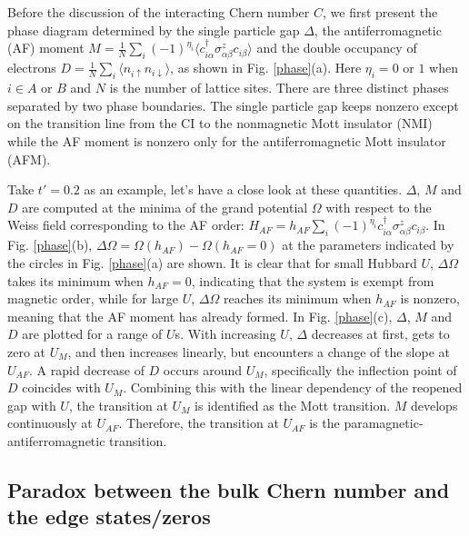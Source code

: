 \documentclass[12pt]{iopart}
\begin{document}
\par Before the discussion of the interacting Chern number $C$, we first present the phase diagram determined by the single particle gap $\Delta$, the antiferromagnetic (AF) moment $M=\frac{1}{N}\sum_i(-1)^{\eta_i}\langle c^\dagger_{i\alpha}\sigma^z_{\alpha\beta}c_{i\beta}\rangle$ and the double occupancy of electrons $D=\frac{1}{N}\sum_i\langle n_{i\uparrow}n_{i\downarrow}\rangle$, as shown in Fig. \ref{phase}(a). Here $\eta_i=0$ or $1$ when $i\in A$ or $B$ and $N$ is the number of lattice sites. There are three distinct phases separated by two phase boundaries. The single particle gap keeps nonzero except on the transition line from the CI to the nonmagnetic Mott insulator (NMI) while the AF moment is nonzero only for the antiferromagnetic Mott insulator (AFM).

\par Take $t'=0.2$ as an example, let's have a close look at these quantities. $\Delta$, $M$ and $D$ are computed at the minima of the grand potential $\Omega$ with respect to the Weiss field corresponding to the AF order: $H_{AF}=h_{AF}\sum_i(-1)^{\eta_i}c^\dagger_{i\alpha}\sigma^z_{\alpha\beta}c_{i\beta}$. In Fig. \ref{phase}(b), $\Delta\Omega=\Omega(h_{AF})-\Omega(h_{AF}=0)$ at the parameters indicated by the circles in Fig. \ref{phase}(a) are shown. It is clear that for small Hubbard $U$, $\Delta\Omega$ takes its minimum when $h_{AF}=0$, indicating that the system is exempt from magnetic order, while for large $U$, $\Delta\Omega$ reaches its minimum when $h_{AF}$ is nonzero, meaning that the AF moment has already formed. In Fig. \ref{phase}(c), $\Delta$, $M$ and $D$ are plotted for a range of $U$s. With increasing $U$, $\Delta$ decreases at first, gets to zero at $U_M$, and then increases linearly, but encounters a change of the slope at $U_{AF}$. A rapid decrease of $D$ occurs around $U_M$, specifically the inflection point of $D$ coincides with $U_M$. Combining this with the linear dependency of the reopened gap with $U$, the transition at $U_M$ is identified as the Mott transition. $M$ develops continuously at $U_{AF}$. Therefore, the transition at $U_{AF}$ is the paramagnetic-antiferromagnetic transition.

\subsection{Paradox between the bulk Chern number and the edge states/zeros}\label{Paradox}
\end{document}
